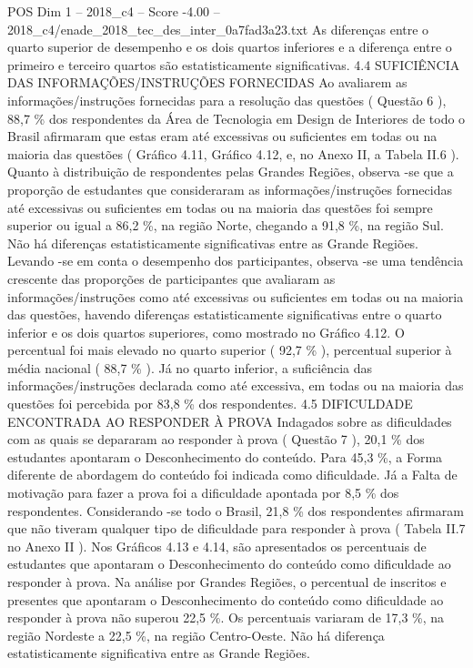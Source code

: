 \begin{textsample}{POS Dim 1 – 2018\_c4 – Score -4.00 – 2018\_c4/enade\_2018\_tec\_des\_inter\_0a7fad3a23.txt}
As diferenças entre o quarto superior de desempenho e os dois quartos inferiores e a diferença entre o primeiro e terceiro quartos são estatisticamente significativas. 4.4 SUFICIÊNCIA DAS INFORMAÇÕES/INSTRUÇÕES FORNECIDAS Ao avaliarem as informações/instruções fornecidas para a resolução das questões ( Questão 6 ), 88,7 \% dos respondentes da Área de Tecnologia em Design de Interiores de todo o Brasil afirmaram que estas eram até excessivas ou suficientes em todas ou na maioria das questões ( Gráfico 4.11, Gráfico 4.12, e, no Anexo II, a Tabela II.6 ).
Quanto à distribuição de respondentes pelas Grandes Regiões, observa -se que a proporção de estudantes que consideraram as informações/instruções fornecidas até excessivas ou suficientes em todas ou na maioria das questões foi sempre superior ou igual a 86,2 \%, na região Norte, chegando a 91,8 \%, na região Sul.
Não há diferenças estatisticamente significativas entre as Grande Regiões.
Levando -se em conta o desempenho dos participantes, observa -se uma tendência crescente das proporções de participantes que avaliaram as informações/instruções como até excessivas ou suficientes em todas ou na maioria das questões, havendo diferenças estatisticamente significativas entre o quarto inferior e os dois quartos superiores, como mostrado no Gráfico 4.12.
O percentual foi mais elevado no quarto superior ( 92,7 \% ), percentual superior à média nacional ( 88,7 \% ).
Já no quarto inferior, a suficiência das informações/instruções declarada como até excessiva, em todas ou na maioria das questões foi percebida por 83,8 \% dos respondentes. 4.5 DIFICULDADE ENCONTRADA AO RESPONDER À PROVA Indagados sobre as dificuldades com as quais se depararam ao responder à prova ( Questão 7 ), 20,1 \% dos estudantes apontaram o Desconhecimento do conteúdo.
Para 45,3 \%, a Forma diferente de abordagem do conteúdo foi indicada como dificuldade.
Já a Falta de motivação para fazer a prova foi a dificuldade apontada por 8,5 \% dos respondentes.
Considerando -se todo o Brasil, 21,8 \% dos respondentes afirmaram que não tiveram qualquer tipo de dificuldade para responder à prova ( Tabela II.7 no Anexo II ).
Nos Gráficos 4.13 e 4.14, são apresentados os percentuais de estudantes que apontaram o Desconhecimento do conteúdo como dificuldade ao responder à prova.
Na análise por Grandes Regiões, o percentual de inscritos e presentes que apontaram o Desconhecimento do conteúdo como dificuldade ao responder à prova não superou 22,5 \%.
Os percentuais variaram de 17,3 \%, na região Nordeste a 22,5 \%, na região Centro-Oeste.
Não há diferença estatisticamente significativa entre as Grande Regiões.

\end{textsample}
